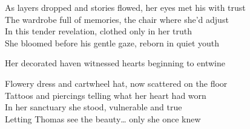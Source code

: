 \begin{lyrics}
As layers dropped and stories flowed, her eyes met his with trust\\
The wardrobe full of memories, the chair where she’d adjust\\
In this tender revelation, clothed only in her truth\\
She bloomed before his gentle gaze, reborn in quiet youth

Her decorated haven witnessed hearts beginning to entwine

Flowery dress and cartwheel hat, now scattered on the floor\\
Tattoos and piercings telling what her heart had worn\\
In her sanctuary she stood, vulnerable and true\\
Letting Thomas see the beauty… only she once knew

\end{lyrics}

